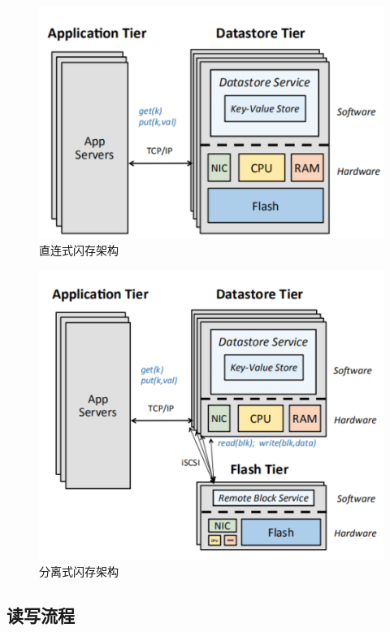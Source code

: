 \begin{figure}
\centering
\includegraphics[scale=0.8]{Figures/storage/d-a_flash_architecture.jpg}
\decoRule
\caption{直连式闪存架构}
\label{fig:d-a_flash_architecture}
\end{figure}

\begin{figure}
\centering
\includegraphics[scale=0.8]{Figures/storage/dis_flash_architecture.jpg}
\decoRule
\caption{分离式闪存架构}
\label{fig:dis_flash_architecture}
\end{figure}

\subsection{读写流程}

